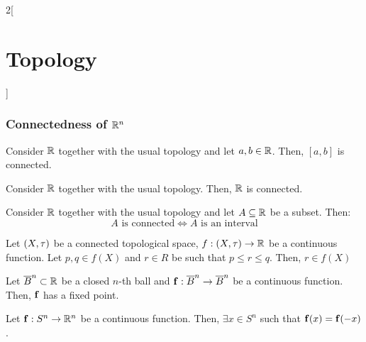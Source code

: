 \documentclass[../../../main.tex]{subfiles}
\begin{document}
\begin{multicols}{2}[\section{Topology}]
  \subsubsection{Connectedness of \texorpdfstring{$\mathbb{R}^n$}{Rn}}
  \begin{theorem}
    Consider $\mathbb{R}$ together with the usual topology and let $a,b\in\mathbb{R}$. Then, $[a,b]$ is connected.
  \end{theorem}
  \begin{theorem}
    Consider $\mathbb{R}$ together with the usual topology. Then, $\mathbb{R}$ is connected.
  \end{theorem}
  \begin{theorem}
    Consider $\mathbb{R}$ together with the usual topology and let $A\subseteq \mathbb{R}$ be a subset. Then: $$A\text{ is connected}\iff A\text{ is an interval}$$
  \end{theorem}
  \begin{theorem}
    Let $(X,\tau)$ be a connected topological space, $f:(X,\tau)\rightarrow\mathbb{R}$ be a continuous function. Let $p,q\in f(X)$ and $r\in R$ be such that $p\leq r\leq q$. Then, $r\in f(X)$
  \end{theorem}
  \begin{theorem}
    Let $\overline{B}^n\subset\mathbb{R}$ be a closed $n$-th ball and $\boldsymbol{\mathrm{f}}:\overline{B}^n\rightarrow\overline{B}^n$ be a continuous function. Then, $\boldsymbol{\mathrm{f}}$ has a fixed point.
  \end{theorem}
  \begin{theorem}
    Let $\boldsymbol{\mathrm{f}}:S^n\rightarrow\mathbb{R}^n$ be a continuous function. Then, $\exists x\in S^n$ such that $\boldsymbol{\mathrm{f}}(x)=\boldsymbol{\mathrm{f}}(-x)$.
  \end{theorem}
\end{multicols}
\end{document}
